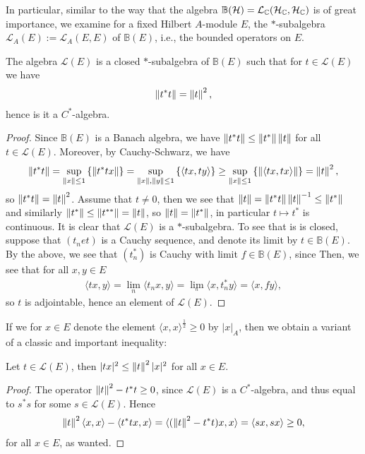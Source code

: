 In particular, similar to the way that the algebra $\mathbb{B}(\mathcal{H}) = \mathcal{L}_{\mathbb{C}}(\mathcal{H}_{\mathbb{C}},\mathcal{H}_{\mathbb{C}})$ is of great importance, we examine for a fixed Hilbert $A$-module $E$, the $*$-subalgebra $\mathcal{L}_A(E):=\mathcal{L}_A(E,E)$ of $\mathbb{B}(E)$, i.e., the bounded operators on $E$.
\begin{proposition}
	The algebra $\mathcal{L}(E)$ is a closed $*$-subalgebra of $\mathbb{B}(E)$ such that for $t \in \mathcal{L}(E)$ we have
	\begin{align*}
		\left\lVert t^*t\right\rVert = \left\lVert t \right\rVert^2,
	\end{align*}
	hence is it a $C^*$-algebra.
\end{proposition}
\begin{proof}
	Since $\mathbb{B}(E)$ is a Banach algebra, we have $\left\lVert t^*t\right\rVert \leq \left\lVert t^*\right\rVert \left\lVert t\right\rVert$ for all $t \in \mathcal{L}(E)$. Moreover, by Cauchy-Schwarz, we have
	\begin{align*}
		\left\lVert t^* t \right\rVert = \sup_{\left\lVert x \right\rVert \leq 1} \left\{ \left\lVert t^*tx\right\rVert \right\} = \sup_{\left\lVert x\right\rVert, \left\lVert y \right\rVert \leq 1} \left\{ \langle tx,ty\rangle \right\}\geq \sup_{\left\lVert x \right\rVert \leq 1} \left\{ \left\lVert \langle tx, tx \rangle \right\rVert \right\} = \left\lVert t \right\rVert^2,
	\end{align*}
	so $\left\lVert t^*t\right\rVert = \left\lVert t\right\rVert^2$. Assume that $t \neq 0$, then we see that $\left\lVert t \right\rVert = \left\lVert t^* t\right\rVert \left\lVert t \right\rVert ^{-1} \leq \left\lVert t^*\right\rVert$ and similarly $\left\lVert t^*\right\rVert \leq \left\lVert t^{**}\right\rVert=\left\lVert t \right\rVert$, so $\left\lVert t \right\rVert = \left\lVert t^*\right\rVert$, in particular $t \mapsto t^*$ is continuous. It is clear that $\mathcal{L}(E)$ is a $*$-subalgebra. To see that is is closed, suppose that $(t_net)$ is a Cauchy sequence, and denote its limit by $t \in \mathbb{B}(E)$. By the above, we see that $(t_n^*)$ is Cauchy with limit $f \in \mathbb{B}(E)$, since  Then, we see that for all $x,y \in E$ 
	\begin{align*}
		\langle t x,y\rangle = \lim_{n}\langle t_n x , y \rangle = \lim_{_n}\langle x, t_n^* y \rangle = \langle x,fy\rangle,
	\end{align*}
	so $t$ is adjointable, hence an element of $\mathcal{L}(E)$.
\end{proof}
If we for $x \in E$ denote the element $\langle x, x \rangle^{\frac12}\geq 0$ by $|x|_A$, then we obtain a variant of a classic and important inequality:
\begin{lemma}
	Let $t \in \mathcal{L}(E)$, then $|tx|^2 \leq \left\lVert t \right\rVert^2 |x|^2$ for all $x \in E$.
\end{lemma}
\begin{proof}
	The operator $\left\lVert t \right\rVert ^2-t^*t\geq 0$, since $\mathcal{L}(E)$ is a $C^*$-algebra, and thus equal to $s^*s$ for some $s \in \mathcal{L}(E)$. Hence
	\begin{align*}
	\left\lVert t \right\rVert^2 \langle x, x \rangle - \langle t^*t x,x\rangle =\langle (\left\lVert t \right\rVert^2 - t^*t)x,x\rangle=	\langle sx , sx \rangle  \geq 0,
	\end{align*}
	for all $x \in E$, as wanted.
\end{proof}
